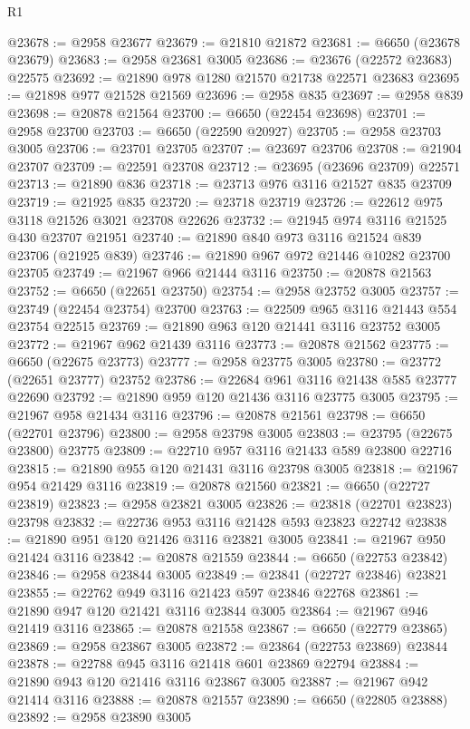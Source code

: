 \begin{lexlean}{R1}
\begin{coremodule}
@23678 := @2958 @23677
@23679 := @21810 @21872
@23681 := @6650 (@23678 @23679)
@23683 := @2958 @23681 @3005
@23686 := @23676 (@22572 @23683) @22575
@23692 := @21890 @978 @1280 @21570 @21738 @22571 @23683
@23695 := @21898 @977 @21528 @21569
@23696 := @2958 @835
@23697 := @2958 @839
@23698 := @20878 @21564
@23700 := @6650 (@22454 @23698)
@23701 := @2958 @23700
@23703 := @6650 (@22590 @20927)
@23705 := @2958 @23703 @3005
@23706 := @23701 @23705
@23707 := @23697 @23706
@23708 := @21904 @23707
@23709 := @22591 @23708
@23712 := @23695 (@23696 @23709) @22571
@23713 := @21890 @836
@23718 := @23713 @976 @3116 @21527 @835 @23709
@23719 := @21925 @835
@23720 := @23718 @23719
@23726 := @22612 @975 @3118 @21526 @3021 @23708 @22626
@23732 := @21945 @974 @3116 @21525 @430 @23707 @21951
@23740 := @21890 @840 @973 @3116 @21524 @839 @23706 (@21925 @839)
@23746 := @21890 @967 @972 @21446 @10282 @23700 @23705
@23749 := @21967 @966 @21444 @3116
@23750 := @20878 @21563
@23752 := @6650 (@22651 @23750)
@23754 := @2958 @23752 @3005
@23757 := @23749 (@22454 @23754) @23700
@23763 := @22509 @965 @3116 @21443 @554 @23754 @22515
@23769 := @21890 @963 @120 @21441 @3116 @23752 @3005
@23772 := @21967 @962 @21439 @3116
@23773 := @20878 @21562
@23775 := @6650 (@22675 @23773)
@23777 := @2958 @23775 @3005
@23780 := @23772 (@22651 @23777) @23752
@23786 := @22684 @961 @3116 @21438 @585 @23777 @22690
@23792 := @21890 @959 @120 @21436 @3116 @23775 @3005
@23795 := @21967 @958 @21434 @3116
@23796 := @20878 @21561
@23798 := @6650 (@22701 @23796)
@23800 := @2958 @23798 @3005
@23803 := @23795 (@22675 @23800) @23775
@23809 := @22710 @957 @3116 @21433 @589 @23800 @22716
@23815 := @21890 @955 @120 @21431 @3116 @23798 @3005
@23818 := @21967 @954 @21429 @3116
@23819 := @20878 @21560
@23821 := @6650 (@22727 @23819)
@23823 := @2958 @23821 @3005
@23826 := @23818 (@22701 @23823) @23798
@23832 := @22736 @953 @3116 @21428 @593 @23823 @22742
@23838 := @21890 @951 @120 @21426 @3116 @23821 @3005
@23841 := @21967 @950 @21424 @3116
@23842 := @20878 @21559
@23844 := @6650 (@22753 @23842)
@23846 := @2958 @23844 @3005
@23849 := @23841 (@22727 @23846) @23821
@23855 := @22762 @949 @3116 @21423 @597 @23846 @22768
@23861 := @21890 @947 @120 @21421 @3116 @23844 @3005
@23864 := @21967 @946 @21419 @3116
@23865 := @20878 @21558
@23867 := @6650 (@22779 @23865)
@23869 := @2958 @23867 @3005
@23872 := @23864 (@22753 @23869) @23844
@23878 := @22788 @945 @3116 @21418 @601 @23869 @22794
@23884 := @21890 @943 @120 @21416 @3116 @23867 @3005
@23887 := @21967 @942 @21414 @3116
@23888 := @20878 @21557
@23890 := @6650 (@22805 @23888)
@23892 := @2958 @23890 @3005

\end{coremodule}
\end{lexlean}
